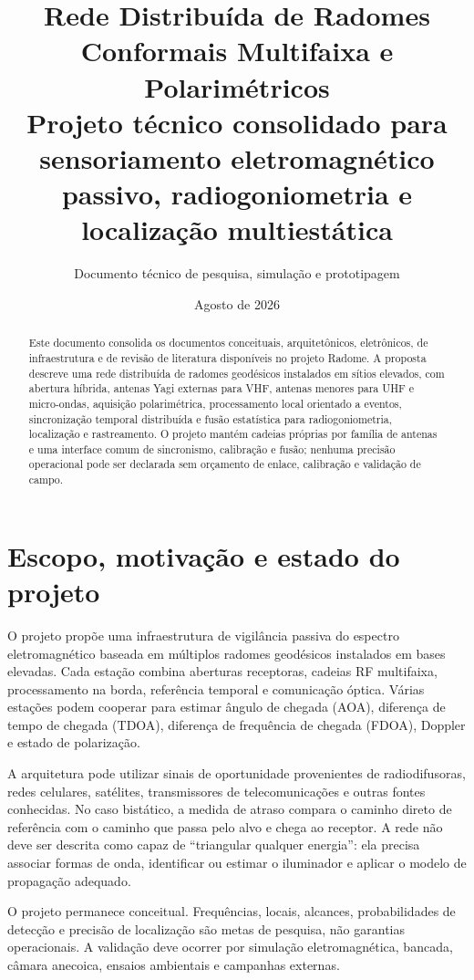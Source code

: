 \documentclass[11pt,a4paper]{report}
\title{\textbf{Rede Distribuída de Radomes Conformais Multifaixa e Polarimétricos}\\[0.5em]\large Projeto técnico consolidado para sensoriamento eletromagnético passivo, radiogoniometria e localização multiestática}
\author{Documento técnico de pesquisa, simulação e prototipagem}
\date{Agosto de 2026}
\begin{document}
\maketitle
\begin{abstract}
Este documento consolida os documentos conceituais, arquitetônicos, eletrônicos, de infraestrutura e de revisão de literatura disponíveis no projeto Radome. A proposta descreve uma rede distribuída de radomes geodésicos instalados em sítios elevados, com abertura híbrida, antenas Yagi externas para VHF, antenas menores para UHF e micro-ondas, aquisição polarimétrica, processamento local orientado a eventos, sincronização temporal distribuída e fusão estatística para radiogoniometria, localização e rastreamento. O projeto mantém cadeias próprias por família de antenas e uma interface comum de sincronismo, calibração e fusão; nenhuma precisão operacional pode ser declarada sem orçamento de enlace, calibração e validação de campo.
\end{abstract}

\tableofcontents
\listoffigures

\chapter{Escopo, motivação e estado do projeto}

O projeto propõe uma infraestrutura de vigilância passiva do espectro eletromagnético baseada em múltiplos radomes geodésicos instalados em bases elevadas. Cada estação combina aberturas receptoras, cadeias RF multifaixa, processamento na borda, referência temporal e comunicação óptica. Várias estações podem cooperar para estimar ângulo de chegada (AOA), diferença de tempo de chegada (TDOA), diferença de frequência de chegada (FDOA), Doppler e estado de polarização.

A arquitetura pode utilizar sinais de oportunidade provenientes de radiodifusoras, redes celulares, satélites, transmissores de telecomunicações e outras fontes conhecidas. No caso bistático, a medida de atraso compara o caminho direto de referência com o caminho que passa pelo alvo e chega ao receptor. A rede não deve ser descrita como capaz de ``triangular qualquer energia'': ela precisa associar formas de onda, identificar ou estimar o iluminador e aplicar o modelo de propagação adequado.

O projeto permanece conceitual. Frequências, locais, alcances, probabilidades de detecção e precisão de localização são metas de pesquisa, não garantias operacionais. A validação deve ocorrer por simulação eletromagnética, bancada, câmara anecoica, ensaios ambientais e campanhas externas.
\end{document}
